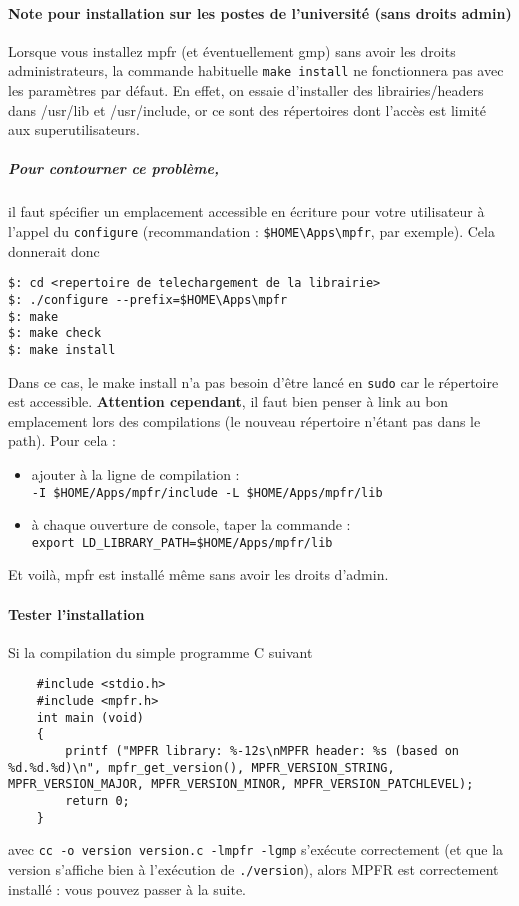 \documentclass[a4paper,11pt]{exam}
\begin{document}
\paragraph{Note pour installation sur les postes de l'université (sans droits admin)}
Lorsque vous installez mpfr (et éventuellement gmp) sans avoir les droits administrateurs, la commande habituelle \verb=make install= ne fonctionnera pas avec les paramètres par défaut. En effet, on essaie d'installer des librairies/headers dans /usr/lib et /usr/include, or ce sont des répertoires dont l'accès est limité aux superutilisateurs.
\subparagraph{Pour contourner ce problème,} il faut spécifier un emplacement accessible en écriture pour votre utilisateur à l'appel du \verb=configure= (recommandation : \verb=$HOME\Apps\mpfr=, par exemple).
Cela donnerait donc
\begin{lstlisting}
$: cd <repertoire de telechargement de la librairie>
$: ./configure --prefix=$HOME\Apps\mpfr
$: make
$: make check
$: make install
\end{lstlisting}
Dans ce cas, le make install n'a pas besoin d'être lancé en \verb=sudo= car le répertoire est accessible.
\textbf{Attention cependant}, il faut bien penser à link au bon emplacement lors des compilations (le nouveau répertoire n'étant pas dans le path).
Pour cela :
\begin{itemize}
	\item ajouter à la ligne de compilation : \\\verb=-I $HOME/Apps/mpfr/include -L $HOME/Apps/mpfr/lib=
	\item à chaque ouverture de console, taper la commande :\\\verb!export LD_LIBRARY_PATH=$HOME/Apps/mpfr/lib!
\end{itemize}
Et voilà, mpfr est installé même sans avoir les droits d'admin.

\paragraph{Tester l'installation}
\label{testInstall}
Si la compilation du simple programme C suivant
\begin{lstlisting}
	#include <stdio.h>
	#include <mpfr.h>
	int main (void)
	{
		printf ("MPFR library: %-12s\nMPFR header: %s (based on %d.%d.%d)\n", mpfr_get_version(), MPFR_VERSION_STRING, MPFR_VERSION_MAJOR, MPFR_VERSION_MINOR, MPFR_VERSION_PATCHLEVEL);
		return 0;
	}
\end{lstlisting}
avec \verb=cc -o version version.c -lmpfr -lgmp= s'exécute correctement (et que la version s'affiche bien à l'exécution de \verb=./version=), alors MPFR est correctement installé : vous pouvez passer à la suite.
\end{document}
